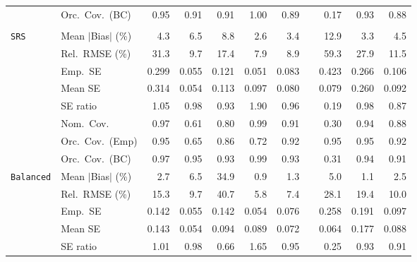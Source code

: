 \begin{landscape}
\begin{longtable}{llrrrrrrrrr}
 & Orc.\ Cov.\ (BC) & \cellcolor{rankone}0.95 & \cellcolor{rankthree}0.91 & \cellcolor{rankthree}0.91 & 1.00 & 0.89 &  & 0.17 & \cellcolor{ranktwo}0.93 & 0.88 \\
\addlinespace[2pt]
\multicolumn{11}{l}{\textbf{Binary \& Categorical Phase-Two Covariates}} \\
\addlinespace[2pt]
\quad \texttt{SRS} & Mean $|$Bias$|$ (\%) & 4.3 & 6.5 & 8.8 & \cellcolor{rankone}2.6 & \cellcolor{rankthree}3.4 &  & 12.9 & \cellcolor{ranktwo}3.3 & 4.5 \\
 & Rel.\ RMSE (\%) & 31.3 & \cellcolor{rankthree}9.7 & 17.4 & \cellcolor{rankone}7.9 & \cellcolor{ranktwo}8.9 &  & 59.3 & 27.9 & 11.5 \\
 & Emp.\ SE & 0.299 & 0.055 & 0.121 & 0.051 & 0.083 &  & 0.423 & 0.266 & 0.106 \\
 & Mean SE & 0.314 & 0.054 & 0.113 & 0.097 & 0.080 &  & 0.079 & 0.260 & 0.092 \\
 & SE ratio & \cellcolor{rankthree}1.05 & \cellcolor{rankone}0.98 & 0.93 & 1.90 & \cellcolor{ranktwo}0.96 &  & 0.19 & \cellcolor{rankone}0.98 & 0.87 \\
 & Nom.\ Cov. & \cellcolor{ranktwo}0.97 & 0.61 & 0.80 & \cellcolor{rankthree}0.99 & \cellcolor{rankthree}0.91 &  & 0.30 & \cellcolor{rankone}0.94 & 0.88 \\
 & Orc.\ Cov.\ (Emp) & \cellcolor{rankone}0.95 & 0.65 & \cellcolor{rankthree}0.86 & 0.72 & \cellcolor{ranktwo}0.92 &  & \cellcolor{rankone}0.95 & \cellcolor{rankone}0.95 & \cellcolor{ranktwo}0.92 \\
 & Orc.\ Cov.\ (BC) & \cellcolor{rankthree}0.97 & \cellcolor{rankone}0.95 & \cellcolor{rankthree}0.93 & 0.99 & \cellcolor{rankthree}0.93 &  & 0.31 & \cellcolor{ranktwo}0.94 & 0.91 \\
\addlinespace[2pt]
\quad \texttt{Balanced} & Mean $|$Bias$|$ (\%) & 2.7 & 6.5 & 34.9 & \cellcolor{rankone}0.9 & \cellcolor{rankthree}1.3 &  & 5.0 & \cellcolor{ranktwo}1.1 & 2.5 \\
 & Rel.\ RMSE (\%) & 15.3 & \cellcolor{rankthree}9.7 & 40.7 & \cellcolor{rankone}5.8 & \cellcolor{ranktwo}7.4 &  & 28.1 & 19.4 & 10.0 \\
 & Emp.\ SE & 0.142 & 0.055 & 0.142 & 0.054 & 0.076 &  & 0.258 & 0.191 & 0.097 \\
 & Mean SE & 0.143 & 0.054 & 0.094 & 0.089 & 0.072 &  & 0.064 & 0.177 & 0.088 \\
 & SE ratio & \cellcolor{rankone}1.01 & \cellcolor{ranktwo}0.98 & 0.66 & 1.65 & \cellcolor{rankthree}0.95 &  & 0.25 & 0.93 & 0.91 \\

\end{longtable}
\end{landscape}

